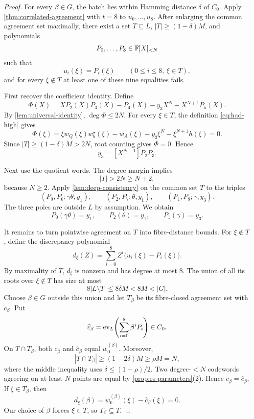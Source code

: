 \begin{proof}
For every $\beta\in G$, the batch lies within Hamming distance $\delta$ of $C_0$.  Apply \cref{thm:correlated-agreement} with $t=8$ to $u_0,\ldots,u_8$.  After enlarging the common agreement set maximally, there exist a set $T\subseteq L$, $|T|\ge(1-\delta)M$, and polynomials
\[
  P_0,\ldots,P_8\in\mathbb{F}[X]_{<N}
\]
such that
\begin{equation}
  u_i(\xi)=P_i(\xi)
  \qquad
  (0\le i\le8,\ \xi\in T),
  \label{eq:had-correlated-agreement}
\end{equation}
and for every $\xi\notin T$ at least one of these nine equalities fails.

First recover the coefficient identity.  Define
\[
  \Phi(X)
  =XP_2(X)P_3(X)-P_4(X)-y_3X^N-X^{N+1}P_5(X).
\]
By \cref{lem:universal-identity}, $\deg\Phi\le2N$.  For every $\xi\in T$, the definition \eqref{eq:had-high} gives
\[
  \Phi(\xi)
  =\xi w_Q(\xi)w_b^{\star}(\xi)-w_A(\xi)-y_3\xi^N-\xi^{N+1}h(\xi)
  =0.
\]
Since $|T|\ge(1-\delta)M>2N$, root counting gives $\Phi=0$.  Hence
\begin{equation}
  y_3=[X^{N-1}]P_2P_3.
  \label{eq:had-batch-middle}
\end{equation}

Next use the quotient words.  The degree margin implies
\[
  |T|>2N\ge N+2,
\]
because $N\ge2$.  Apply \cref{lem:deep-consistency} on the common set $T$ to the triples
\[
  (P_0,P_6;\gamma\theta,y_1),
  \qquad
  (P_2,P_7;\theta,y_1),
  \qquad
  (P_1,P_8;\gamma,y_3).
\]
The three poles are outside $L$ by assumption.  We obtain
\begin{equation}
  P_0(\gamma\theta)=y_1,
  \qquad
  P_2(\theta)=y_1,
  \qquad
  P_1(\gamma)=y_3.
  \label{eq:had-batch-deep-values}
\end{equation}

It remains to turn pointwise agreement on $T$ into fibre-distance bounds.  For $\xi\notin T$, define the discrepancy polynomial
\[
  d_\xi(Z)
  =\sum_{i=0}^8 Z^i\bigl(u_i(\xi)-P_i(\xi)\bigr).
\]
By maximality of $T$, $d_\xi$ is nonzero and has degree at most $8$.  The union of all its roots over $\xi\notin T$ has size at most
\[
  8|L\setminus T|\le8\delta M<8M<|G|.
\]
Choose $\beta\in G$ outside this union and let $T_\beta$ be its fibre-closed agreement set with $c_\beta$.  Put
\[
  \widehat c_\beta
  =\operatorname{ev}_L\!\left(\sum_{i=0}^8\beta^iP_i\right)\in C_0.
\]
On $T\cap T_\beta$, both $c_\beta$ and $\widehat c_\beta$ equal $w_0^{(\beta)}$.  Moreover,
\[
  |T\cap T_\beta|
  \ge(1-2\delta)M
  \ge\rho M
  =N,
\]
where the middle inequality uses $\delta\le(1-\rho)/2$.  Two degree-$<N$ codewords agreeing on at least $N$ points are equal by \cref{prop:rs-parameters}(2).  Hence $c_\beta=\widehat c_\beta$.  If $\xi\in T_\beta$, then
\[
  d_\xi(\beta)
  =w_0^{(\beta)}(\xi)-\widehat c_\beta(\xi)
  =0.
\]
Our choice of $\beta$ forces $\xi\in T$, so $T_\beta\subseteq T$.


\end{proof}
